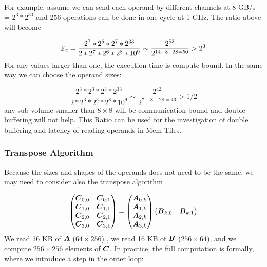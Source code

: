 \documentclass[journal]{IEEEtran}
\begin{document}
For example, assume we can send each operand by different channels at
8 GB/s = $2^3 *2^{30}$ and 256 operations can be done in one cycle at
1 GHz. The ratio above will become

\[
\mathbb{F}_c = \frac{2^7 * 2^6 * 2^7 * 2^{33}} { 2* 2^7 * 2^6* 2^8 *10^9} \sim \frac{2^{53}}{2^{14+8+28=50}} > 2^3  
\]
For any values larger than one, the execution time is compute
bound. In the same way we can choose the operand sizes:

\[
\frac{2^3 * 2^3 * 2^3 * 2^{33}} { 2* 2^3 * 2^3* 2^8 *10^9} \sim \frac{2^{42}}{2^{7+8+28=43}} >1/2    
\]
any sub volume smaller than $8 \times 8$ will be communication bound
and double buffering will not help. This Ratio can be used for the
investigation of double buffering and latency of reading operands in
Mem-Tiles.

\subsubsection{Transpose Algorithm}
Because the sizes and shapes of the operands does not need to be the
same, we may need to consider also the transpose algorithm

{\small \begin{equation}
  \label{eq:gemmB}
  \begin{pmatrix}
    \Vc{C}_{0,0}  & \Vc{C}_{0,1}  \\
    \Vc{C}_{1,0}  & \Vc{C}_{1,1}    \\
    \Vc{C}_{2,0}  & \Vc{C}_{2,1}  \\
    \Vc{C}_{3,0}  & \Vc{C}_{3,1} \\
  \end{pmatrix}    =
  \begin{pmatrix}
    \Vc{A}_{0,k}  \\
    \Vc{A}_{1,k}  \\
    \Vc{A}_{2,k}  \\
    \Vc{A}_{3,k}  \\
  \end{pmatrix}  
  \begin{pmatrix}
    \Vc{B}_{k,0}  &  \Vc{B}_{k,1}  \\
  \end{pmatrix}    
\end{equation}
} We read 16 KB of ${\boldsymbol A}$ ($64 \times 256$) , we read 16 KB of
${\boldsymbol B}$ ($256 \times 64$), and we compute $256 \times 256$ elements
of ${\boldsymbol C}$. In practice, the full computation is formally, where we
introduce a step in the outer loop: 
\end{document}
